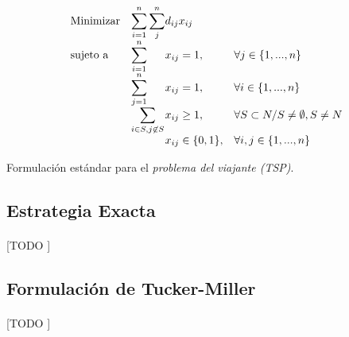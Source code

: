 \documentclass[spanish]{article}
\begin{document}
		\begin{eqfloat}
			\begin{equation}
				\begin{array}{ll@{}ll}
					\text{Minimizar}	& \displaystyle\sum\limits_{i = 1}^{n}\sum\limits_{j}^{n} & d_{ij}x_{ij} &\\
					\text{sujeto a}		& \displaystyle\sum\limits_{i = 1}^{n}	&	x_{ij} 	= 1,  & \forall j \in \{1,...,n\}\\
														& \displaystyle\sum\limits_{j = 1}^{n}	&	x_{ij} 	= 1,  & \forall i \in \{1,...,n\}\\
														& \displaystyle\sum\limits_{i \in S, j \not\in S}	&	x_{ij} 	\geq 1,  & \forall S \subset N / S \neq \emptyset, S \neq N \\
														&                               &	x_{ij} \in \{0,1\}, 	& \forall i,j \in \{1,...,n\}
				\end{array}
			\end{equation}
			\caption{Formulación estándar para el \emph{problema del viajante (TSP)}.}
			\label{eq:tsp_basic}
		\end{eqfloat}

		\subsection{Estrategia Exacta}

			\paragraph{}
			[TODO ]

			\subsection{Formulación de Tucker-Miller}

				\paragraph{}
				[TODO ]
\end{document}
